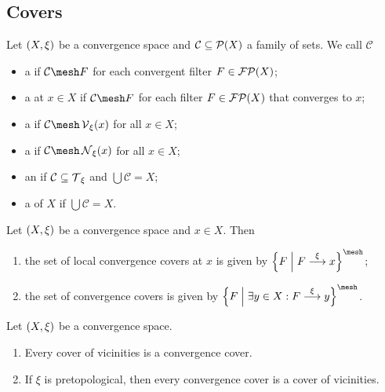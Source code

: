 \subsection{Covers}
\begin{definition}
Let $\left( X,\xi \right)$ be a convergence space and $\mathcal{C}\subseteq \operatorname{\mathcal{P}}(X)$ a family of sets. We call $\mathcal{C}$ 
\begin{itemize}
\item a  if $\mathcal{C}\mesh F$ for each convergent filter $F\in\operatorname{\mathcal{FP}}(X)$;
\item a  at $x\in X$ if $\mathcal{C}\mesh F$ for each filter $F\in\operatorname{\mathcal{FP}}(X)$ that converges to $x$;
\item a  if $\mathcal{C}\mesh \vicinity_\xi(x)$ for all $x\in X$;
\item a  if $\mathcal{C}\mesh \neighbourhood_\xi(x)$ for all $x\in X$;
\item an  if $\mathcal{C} \subseteq \operatorname{\mathcal{T}}_\xi$ and $\bigcup \mathcal{C} = X$;
\item a  of $X$ if $\bigcup \mathcal{C} = X$.
\end{itemize}
\end{definition}

\begin{lemma}
Let $\left( X,\xi \right)$ be a convergence space and $x\in X$. Then
\begin{enumerate}
\item the set of local convergence covers at $x$ is given by $\setbuilder{F}{F\overset{\xi}{\longrightarrow} x}^\mesh$;
\item the set of convergence covers is given by $\setbuilder{F}{\exists y\in X: F\overset{\xi}{\longrightarrow} y}^\mesh$.
\end{enumerate}
\end{lemma}

\begin{lemma}
Let $\left( X,\xi \right)$ be a convergence space.
\begin{enumerate}
\item Every cover of vicinities is a convergence cover.
\item If $\xi$ is pretopological, then every convergence cover is a cover of vicinities.
\end{enumerate}
\end{lemma}

